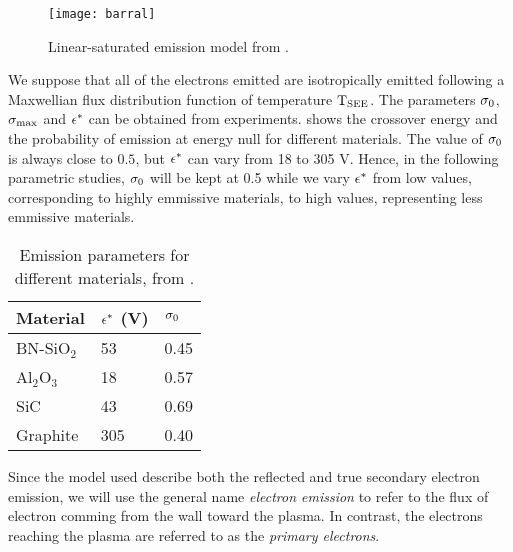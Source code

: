 \begin{figure}[hbtp]
  \centering
  \texttt{[image: barral]}
  \caption{Linear-saturated emission model from \citet{barral2003a}.}
  \label{fig-modelbarral}
\end{figure}

 We suppose that all of the electrons emitted are isotropically emitted following a Maxwellian flux distribution function of temperature $\mathrm{T_{SEE}}$.
 The parameters $\sigma _0$,  $\sigma _{\rm max} $ and $\epsilon^{*}$ can be obtained from experiments. 
  shows the crossover energy and the  probability of emission at energy null for different materials.
 The value of $\sigma _0$ is always close to $0.5$, but $\epsilon^{*}$ can vary from 18 to 305 V.
 Hence, in the following parametric studies, $\sigma _0$ will be kept at 0.5 while we vary $\epsilon^{*}$ from low values, corresponding to highly emmissive materials, to high values, representing less emmissive materials.
 
 \begin{table}[hbtp]
   \centering
   \caption{Emission parameters for different materials, from \citet{barral2003a}.}
   \label{tab-seeparames}
   \begin{tabular}{@{}lll@{}} \toprule
   Material & $\epsilon^{*}$ (V)& $\sigma _0$ \\ \midrule
   BN-SiO$_2$ & 53 & 0.45 \\ 
   Al$_2$O$_3$ & 18  & 0.57 \\ 
   SiC     &  43  &0.69  \\
   Graphite & 305  & 0.40 \\ 
   \bottomrule
   \end{tabular}
 \end{table}
 
 Since the model used describe both the reflected and true secondary electron emission, we will use the general name \emph{electron emission}  to refer to the flux of electron comming from the wall toward the plasma.
 In contrast, the electrons reaching the plasma are referred to as the \emph{primary electrons}.
